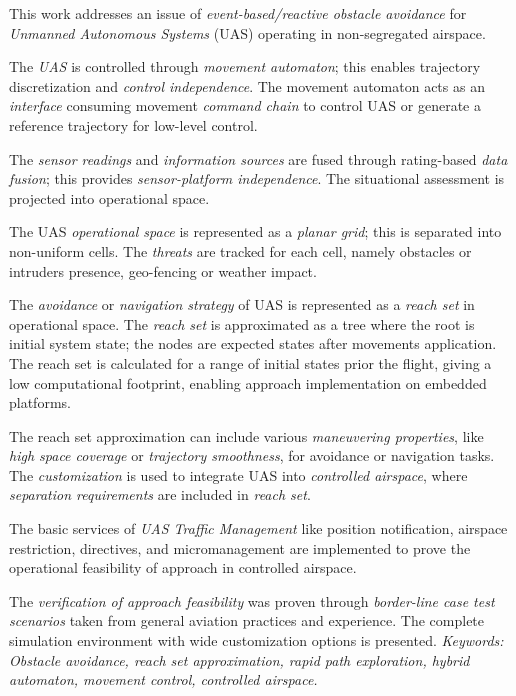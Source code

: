 \noindent This work addresses an issue of \emph{event-based/reactive obstacle avoidance} for \emph{Unmanned Autonomous Systems} (UAS) operating in non-segregated airspace. 

The \emph{UAS} is controlled through \emph{movement automaton}; this enables trajectory discretization and \emph{control independence}. The movement automaton acts as an \emph{interface} consuming movement \emph{command chain} to control UAS or generate a reference trajectory for low-level control.

The \emph{sensor readings} and \emph{information sources} are fused through rating-based \emph{data fusion}; this provides \emph{sensor-platform independence}. The situational assessment is projected into operational space.

The UAS \emph{operational space} is represented as a \emph{planar grid}; this is separated into non-uniform cells. The \emph{threats} are tracked for each cell, namely obstacles or intruders presence, geo-fencing or weather impact. 

The \emph{avoidance} or \emph{navigation strategy} of UAS is represented as a \emph{reach set} in operational space. The \emph{reach set} is approximated as a tree where the root is initial system state; the nodes are expected states after movements application. The reach set is calculated for a range of initial states prior the flight, giving a low computational footprint, enabling approach implementation on embedded platforms. 

The reach set approximation can include various \emph{maneuvering properties}, like \emph{high space coverage} or \emph{trajectory smoothness}, for avoidance or navigation tasks. The \emph{customization} is used to integrate UAS into \emph{controlled airspace}, where \emph{separation requirements} are included in \emph{reach set}.

The basic services of \emph{UAS Traffic Management} like position notification, airspace restriction, directives, and micromanagement are implemented to prove the operational feasibility of approach in controlled airspace. 

The \emph{verification of approach feasibility} was proven through \emph{border-line case test scenarios} taken from general aviation practices and experience. The complete simulation environment with wide customization options is presented.
\vskip 16pt
\noindent \emph{Keywords: Obstacle avoidance, reach set approximation, rapid path exploration, hybrid automaton, movement control, controlled airspace.}